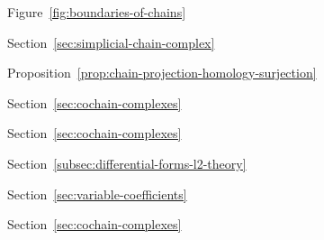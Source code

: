 \par\noindent\hspace*{0em}\label{index:chain}

\par\noindent\hspace*{1em}\label{index:chain-boundary-of}\quad Figure~\ref{fig:boundaries-of-chains}

\par\noindent\hspace*{1em}\label{index:chain-simplicial}\quad Section~\ref{sec:simplicial-chain-complex}

\par\noindent\hspace*{0em}\label{index:chain-projection}\quad Proposition~\ref{prop:chain-projection-homology-surjection}

\par\noindent\hspace*{0em}\label{index:coboundary}\quad Section~\ref{sec:cochain-complexes}

\par\noindent\hspace*{0em}\label{index:cocycle}\quad Section~\ref{sec:cochain-complexes}

\par\noindent\hspace*{0em}\label{index:codifferential}\quad Section~\ref{subsec:differential-forms-l2-theory}

\par\noindent\hspace*{0em}\label{index:coefficients-variable}\quad Section~\ref{sec:variable-coefficients}

\par\noindent\hspace*{0em}\label{index:cohomology}\quad Section~\ref{sec:cochain-complexes}

